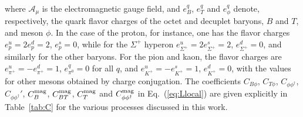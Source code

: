 \documentclass[preprintnumbers,prd,superscriptaddress,preprint]{revtex4-1}
\begin{document}
%
where $\mathscr{A_\mu}$ is the electromagnetic gauge field, and $e^q_B$, $e^q_T$ and $e^q_\phi$ denote, respectively, the quark flavor charges of the octet and decuplet baryons, $B$ and $T$, and meson $\phi$.
%
In the case of the proton, for instance, one has the flavor charges
%
$e^u_p = 2 e^d_p = 2$, $e^s_p = 0$,
%
while for the $\Sigma^+$ hyperon
%
$e^u_{\Sigma^+} = 2 e^s_{\Sigma^+} = 2$, $e^d_{\Sigma^+} = 0$,
%
and similarly for the other baryons.
%
For the pion and kaon, the flavor charges are
%
$e^u_{\pi^+} = -e^d_{\pi^+} = 1$, $e^q_{\pi^0} = 0$ for all $q$,
%
and 
%
$e^u_{K^+} = -e^s_{K^+} = 1$, $e^d_{K^+} = 0$,
%
with the values for other mesons obtained by charge conjugation.
The coefficients $C_{B\phi}$, $C_{T\phi}$, $C_{\phi\phi^\dag}$, $C_{\phi\phi^\dag}'$, $C_B^{\rm mag}$, $C_{BT}^{\rm mag}$, $C_T^{\rm mag}$ and $C_{\phi\phi^\dag}^{\rm mag}$ in Eq.~(\ref{eq:Llocal}) are given explicitly in Table~\ref{tab:C} for the various processes discussed in this work.
\end{document}
